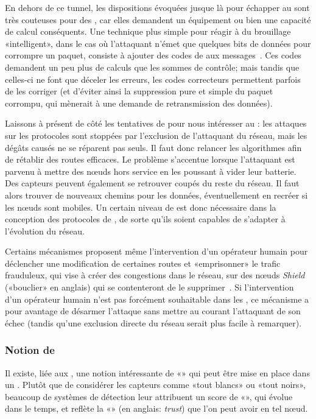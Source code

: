 En dehors de ce tunnel, les dispositions évoquées jusque là pour échapper au  sont très couteuses pour des \rcs, car elles demandent un équipement ou bien une capacité de calcul conséquents.
Une technique plus simple pour réagir à du brouillage «intelligent», dans le cas où l'attaquant n'émet que quelques bits de données pour corrompre un paquet, consiste à ajouter des codes de  aux messages~\cite{PI11}.
Ces codes demandent un peu plus de calculs que les sommes de contrôle; mais tandis que celles-ci ne font que déceler les erreurs, les codes correcteurs permettent parfois de les corriger (et d'éviter ainsi la suppression pure et simple du paquet corrompu, qui mènerait à une demande de retransmission des données).

Laissons à présent de côté les tentatives de  pour nous intéresser au : les attaques sur les protocoles sont stoppées par l'exclusion de l'attaquant du réseau, mais les dégâts causés ne se réparent pas seuls.
Il faut donc relancer les algorithmes afin de rétablir des routes efficaces.
Le problème s'accentue lorsque l'attaquant est parvenu à mettre des nœuds hors service en les poussant à vider leur batterie.
Des capteurs peuvent également se retrouver coupés du reste du réseau.
Il faut alors trouver de nouveaux chemins pour les données, éventuellement en recréer si les nœuds sont mobiles.
Un certain niveau de \resilience est donc nécessaire dans la conception des protocoles de , de sorte qu'ils soient capables de s'adapter à l'évolution du réseau.

Certains mécanismes proposent même l'intervention d'un opérateur humain pour déclencher une modification de certaines routes et «emprisonner» le trafic frauduleux, qui vise à créer des congestions dans le réseau, sur des nœuds \textit{Shield} («bouclier» en anglais) qui se contenteront de le supprimer~\cite{HSP13}.
Si l'intervention d'un opérateur humain n'est pas forcément souhaitable dans les \rcs, ce mécanisme a pour avantage de désarmer l'attaque sans mettre au courant l'attaquant de son échec (tandis qu'une exclusion directe du réseau serait plus facile à remarquer).

    \subsubsection{Notion de }
Il existe, liée aux \IDS, une notion intéressante de «» qui peut être mise en place dans un \rc.
Plutôt que de considérer les capteurs comme «tout blancs» ou «tout noirs», beaucoup de systèmes de détection leur attribuent un score de «\reput», qui évolue dans le temps, et reflète la «» (en anglais: \textit{trust}) que l'on peut avoir en tel nœud.

